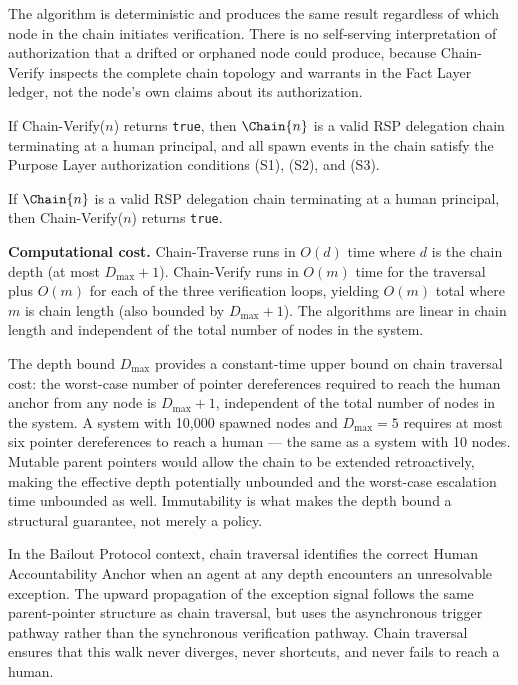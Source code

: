 The algorithm is deterministic and produces the same result regardless of which node in the chain initiates verification. There is no self-serving interpretation of authorization that a drifted or orphaned node could produce, because Chain-Verify inspects the complete chain topology and warrants in the Fact Layer ledger, not the node's own claims about its authorization.

\begin{prop}
\label{prop:chain-verify-soundness}
If Chain-Verify($n$) returns \texttt{true}, then $\Chain{n}$ is a valid RSP delegation chain terminating at a human principal, and all spawn events in the chain satisfy the Purpose Layer authorization conditions (S1), (S2), and (S3).
\end{prop}

\begin{prop}
\label{prop:chain-verify-completeness}
If $\Chain{n}$ is a valid RSP delegation chain terminating at a human principal, then Chain-Verify($n$) returns \texttt{true}.
\end{prop}

\medskip
\noindent\textbf{Computational cost.} Chain-Traverse runs in $O(d)$ time where $d$ is the chain depth (at most $D_{\max} + 1$). Chain-Verify runs in $O(m)$ time for the traversal plus $O(m)$ for each of the three verification loops, yielding $O(m)$ total where $m$ is chain length (also bounded by $D_{\max} + 1$). The algorithms are linear in chain length and independent of the total number of nodes in the system.

The depth bound $D_{\max}$ provides a constant-time upper bound on chain traversal cost: the worst-case number of pointer dereferences required to reach the human anchor from any node is $D_{\max} + 1$, independent of the total number of nodes in the system. A system with 10,000 spawned nodes and $D_{\max} = 5$ requires at most six pointer dereferences to reach a human --- the same as a system with 10 nodes. Mutable parent pointers would allow the chain to be extended retroactively, making the effective depth potentially unbounded and the worst-case escalation time unbounded as well. Immutability is what makes the depth bound a structural guarantee, not merely a policy.

In the Bailout Protocol context, chain traversal identifies the correct Human Accountability Anchor when an agent at any depth encounters an unresolvable exception. The upward propagation of the exception signal follows the same parent-pointer structure as chain traversal, but uses the asynchronous trigger pathway rather than the synchronous verification pathway. Chain traversal ensures that this walk never diverges, never shortcuts, and never fails to reach a human.

